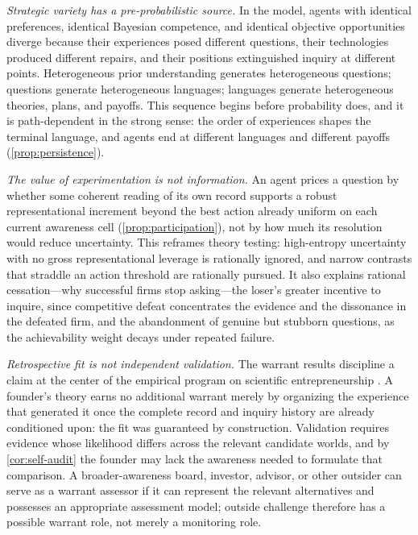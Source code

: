 \documentclass[11pt]{article}
\theoremstyle{definition}
\begin{document}
\emph{Strategic variety has a pre-probabilistic source.}
In the model, agents with identical preferences, identical Bayesian competence, and identical objective opportunities diverge because their experiences posed different questions, their technologies produced different repairs, and their positions extinguished inquiry at different points.
Heterogeneous prior understanding generates heterogeneous questions; questions generate heterogeneous languages; languages generate heterogeneous theories, plans, and payoffs.
This sequence begins before probability does, and it is path-dependent in the strong sense: the order of experiences shapes the terminal language, and agents end at different languages and different payoffs (\cref{prop:persistence}).

\emph{The value of experimentation is not information.}
An agent prices a question by whether some coherent reading of its own record supports a robust representational increment beyond the best action already uniform on each current awareness cell (\cref{prop:participation}), not by how much its resolution would reduce uncertainty.
This reframes theory testing: high-entropy uncertainty with no gross representational leverage is rationally ignored, and narrow contrasts that straddle an action threshold are rationally pursued.
It also explains rational cessation---why successful firms stop asking---the loser's greater incentive to inquire, since competitive defeat concentrates the evidence and the dissonance in the defeated firm, and the abandonment of genuine but stubborn questions, as the achievability weight decays under repeated failure.

\emph{Retrospective fit is not independent validation.}
The warrant results discipline a claim at the center of the empirical program on scientific entrepreneurship \citep{CamuffoEtAl2020,ZellwegerZenger2023}.
A founder's theory earns no additional warrant merely by organizing the experience that generated it once the complete record and inquiry history are already conditioned upon: the fit was guaranteed by construction.
Validation requires evidence whose likelihood differs across the relevant candidate worlds, and by \cref{cor:self-audit} the founder may lack the awareness needed to formulate that comparison.
A broader-awareness board, investor, advisor, or other outsider can serve as a warrant assessor if it can represent the relevant alternatives and possesses an appropriate assessment model; outside challenge therefore has a possible warrant role, not merely a monitoring role.
\end{document}
